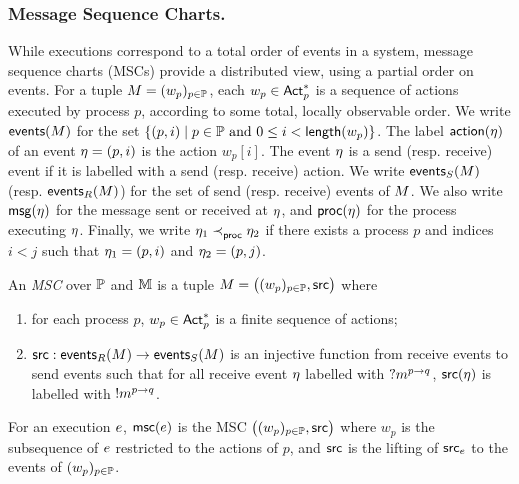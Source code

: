\subsubsection*{Message Sequence Charts.}
While executions correspond to a total order of events in a system,  
message sequence charts (MSCs) provide a distributed view, using  
a partial order on events.  
For a tuple $M=(w_p)_{p\in\mathbb{P}}$, each $w_p \in \mathsf{Act}_{p}^*$ is a  
sequence of actions executed by process $p$, according to some  
total, locally observable order.  
We write $\mathsf{events}(M)$ for the set  
$\{(p,i) \mid p \in \mathbb{P} \text{ and } 0 \leq i < \mathsf{length}(w_p)\}$.  
The label $\mathsf{action}(\eta)$ of an event $\eta=(p,i)$ is the action  
$w_p[i]$. The event $\eta$ is a send (resp. receive) event if it is  
labelled with a send (resp. receive) action.  
We write $\mathsf{events}_S(M)$ (resp. $\mathsf{events}_R(M)$)  
for the set of send (resp. receive) events of $M$. We also write  
$\mathsf{msg}(\eta)$ for the message sent or received at $\eta$, and  
$\mathsf{proc}(\eta)$ for the process executing $\eta$.  
Finally, we write $\eta_1 \mathrel{\prec_{\mathsf{proc}}^{}} \eta_2$ if there  
exists a process $p$ and indices $i<j$ such that  
$\eta_1=(p,i)$ and $\eta_2=(p,j)$.  

\bigskip

\begin{definition}\label{def:msc}
	An \emph{MSC} over $\mathbb{P}$ and $\mathbb{M}$ is a tuple 
	$M = \big((w_p)_{p\in\mathbb{P}},\mathsf{src}\big)$ where
    \begin{enumerate}
        \item for each process $p$, $w_p\in\mathsf{Act}_{p}^*$ is a finite sequence 
			of actions;
		\item $\mathsf{src} : \mathsf{events}_R(M) \to \mathsf{events}_S(M)$ is 
			an injective function from receive events to send events such that
			for all receive event $\eta$ labelled with $?m^{p\to q}$,
			$\mathsf{src}(\eta)$ is labelled with $!m^{p\to q}$.
    \end{enumerate}
\end{definition}

For an execution $e$,  $\mathsf{msc}(e)$ is the MSC 
$\big((w_p)_{p\in\mathbb{P}},\mathsf{src}\big)$ where $w_p$ is the 
subsequence of $e$ restricted to the actions of $p$,
and $\mathsf{src}$ is the lifting of $\mathsf{src}_{e}$ to the
events of $(w_p)_{p\in\mathbb{P}}$.

\bigskip

